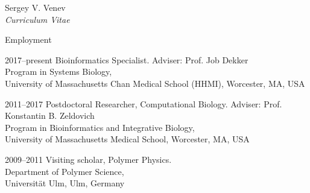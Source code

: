 \documentclass[10pt]{article}
\begin{document}
\begin{cv}{Sergey V. Venev\\{\large \itshape Curriculum Vitae}}
\begin{cvlist}{Employment}
    \item[2017--present] Bioinformatics Specialist. Adviser: Prof. Job Dekker\\
    Program in Systems Biology,\\ University of Massachusetts Chan Medical School (HHMI),
    Worcester, MA, USA
    \item[2011--2017] Postdoctoral Researcher, Computational Biology. Adviser: Prof. Konstantin B. Zeldovich\\
    Program in Bioinformatics and Integrative Biology,\\ University of Massachusetts Medical School,
    Worcester, MA, USA 
    \item[2009--2011] Visiting scholar, Polymer Physics. \\
    Department of Polymer Science,\\
    Universit{\"a}t Ulm, Ulm, Germany  
\end{cvlist}




\end{cv}
\end{document}
